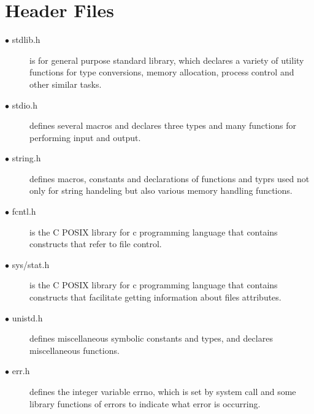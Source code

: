 \documentclass[12pt,a4paper,oneside]{report}
\begin{document}
\section*{Header Files}
\begin{description}
  \item[$\bullet$ stdlib.h] is for general purpose standard library, which declares a variety of utility functions for type conversions, memory allocation, process control and other similar tasks.
  \item[$\bullet$ stdio.h] defines several macros and declares three types and many functions for performing input and output.
  \item[$\bullet$ string.h] defines macros, constants and declarations of functions and typrs used not only for string handeling but also various memory handling functions.
  \item[$\bullet$ fcntl.h] is the C POSIX library for c programming language that contains constructs that refer to file control.
  \item[$\bullet$ sys/stat.h] is the C POSIX library for c programming language that contains constructs that facilitate getting information about files attributes.
  \item[$\bullet$ unistd.h] defines miscellaneous symbolic constants and types, and declares miscellaneous functions.
  \item[$\bullet$ err.h] defines the integer variable errno, which is set by system call and some library functions of errors to indicate what error is occurring.
\end{description}

\newpage
\end{document}
